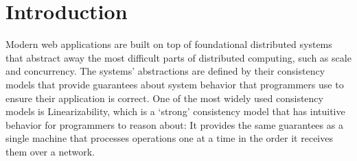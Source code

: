 \section{Introduction}
\label{sec:intro}

Modern web applications are built on top of foundational distributed systems that abstract away
the most difficult parts of distributed computing, such as scale and concurrency.
The systems' abstractions are defined by their consistency models that provide guarantees about system behavior that programmers use to ensure their application is correct.
One of the most widely used consistency models is Linearizability, which is a ‘strong’ consistency model that has intuitive
behavior for programmers to reason about:
It provides the same guarantees as a single machine that processes operations
one at a time in the order it receives them over a network.







